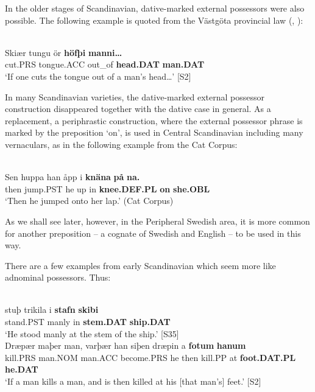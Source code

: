 In the older stages of Scandinavian, dative-marked external possessors were also possible. The following example is quoted from the Västgöta provincial law (\citet[15]{Wessén1956}, \citet[212]{Norde1997}): 

\ea\label{}
\\
\gll Skiær  tungu  ör  \textbf{höfþi} \textbf{manni…}\\
cut.PRS  tongue.ACC  out\_of  \textbf{head.DAT} \textbf{man.DAT}\\
\glt ‘If one cuts the tongue out of a man’s head…’ [S2]
\z

In many Scandinavian varieties, the dative-marked external possessor construction disappeared together with the dative case in general. As a replacement, a periphrastic construction, where the external possessor phrase is marked by the preposition  ‘on’, is used in Central Scandinavian including many vernaculars, as in the following example from the Cat Corpus: 

\ea\label{}
\\
\gll Sen  huppa  han  åpp  i  \textbf{knäna} \textbf{på} \textbf{na.}\\
then  jump.PST  he  up  in  \textbf{knee.DEF.PL} \textbf{on} \textbf{she.OBL}\\
\glt ‘Then he jumped onto her lap.’ (Cat Corpus)
\z

As we shall see later, however, in the Peripheral Swedish area, it is more common for another preposition – a cognate of Swedish  and English  – to be used in this way.

There are a few examples from early Scandinavian which seem more like adnominal possessors. Thus:

\ea\label{}
	\ea 
		\\
		\gll stuþ  trikila  i  \textbf{stafn} \textbf{skibi}\\
		stand.PST  manly  in  \textbf{stem.DAT} \textbf{ship.DAT}\\
		\glt ‘He stood manly at the stem of the ship.’ [S35]
	\ex 
		\\
		\gll Dræpær  maþer  man, varþær  han  siþen  dræpin  a  \textbf{fotum} \textbf{hanum}\\
		kill.PRS  man.NOM  man.ACC become.PRS  he  then  kill.PP  at  \textbf{foot.DAT.PL} \textbf{he.DAT}\\
		\glt ‘If a man kills a man, and is then killed at his [that man’s] feet.’ [S2]
	\z 
\z

